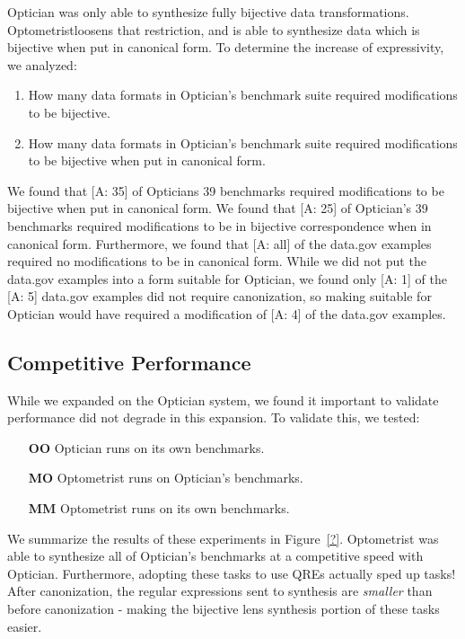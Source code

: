 \documentclass{svproc}
\newcommand{\FINISH}[3]{\ifdraft\textcolor{#1}{[#2: #3]}\fi}
\newcommand{\afm}[1]{\FINISH{dkgreen}{A}{#1}}
\newcommand{\SystemOnBenchmarks}{\textbf{MM}}
\newcommand{\SystemOnOptician}{\textbf{MO}}
\newcommand{\OpticianRuntime}{\textbf{OO}}
\newcommand{\Name}{Optometrist}
\begin{document}
Optician was only able to synthesize fully bijective data transformations.
\Name loosens that restriction, and is able to synthesize data which is
bijective when put in canonical form.
To determine the increase of expressivity, we analyzed:
\begin{enumerate}
\item How many data formats in Optician's benchmark suite required modifications
  to be bijective.
\item How many data formats in Optician's benchmark suite required modifications
  to be bijective when put in canonical form.
\end{enumerate}

We found that \afm{35} of Opticians 39 benchmarks required modifications to be
bijective when put in canonical form. We found that \afm{25} of Optician's 39
benchmarks required modifications to be in bijective correspondence when in
canonical form.  Furthermore, we found that \afm{all} of the data.gov examples
required no modifications to be in canonical form.  While we did not put the
data.gov examples into a form suitable for Optician, we found only \afm{1} of
the \afm{5} data.gov examples did not require canonization, so making suitable
for Optician would have required a modification of \afm{4} of the data.gov
examples.

\subsection{Competitive Performance}

While we expanded on the Optician system, we found it important to validate
performance did not degrade in this expansion.  To validate this, we tested:
\begin{itemize}
\item[\OpticianRuntime{}] Optician runs on its own benchmarks.
\item[\SystemOnOptician{}] \Name{} runs on Optician's benchmarks.
\item[\SystemOnBenchmarks{}] \Name{} runs on its own benchmarks.
\end{itemize}

We summarize the results of these experiments in Figure~\ref{?}.  \Name{} was
able to synthesize all of Optician's benchmarks at a competitive speed with
Optician.  Furthermore, adopting these tasks to use QREs actually sped up
tasks!  After canonization, the regular expressions sent to synthesis are
\emph{smaller} than before canonization - making the bijective lens synthesis
portion of these tasks easier.
\end{document}
